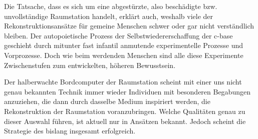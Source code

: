 \begin{newstuff}
    Die Tatsache, dass es sich um eine abgestürzte, also beschädigte bzw. unvollständige Raumstation handelt, erklärt auch, weshalb viele der Rekonstruktionsansätze für gemeine Menschen schwer oder gar nicht verständlich bleiben. Der autopoietische Prozess der Selbstwiedererschaffung der c-base geschieht durch mitunter fast infantil anmutende experimentelle Prozesse und Vorprozesse. Doch wie beim werdenden Menschen sind alle diese Experimente Zwischenstufen zum entwickelten, höheren Bewusstsein.  


    Der halberwachte Bordcomputer der Raumstation  scheint mit einer uns nicht genau bekannten Technik immer wieder Individuen mit besonderen Begabungen anzuziehen, die dann durch dasselbe Medium inspiriert werden, die Rekonstruktion der Raumstation voranzubringen. Welche Qualitäten genau zu dieser Auswahl führen, ist aktuell nur in Ansätzen bekannt. Jedoch scheint die Strategie des  bislang insgesamt erfolgreich.
\end{newstuff}


    

